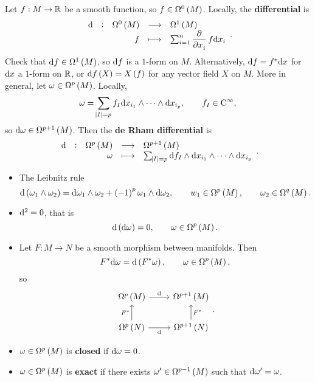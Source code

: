 Let $ f : M \to \mathbb{R} $ be a smooth function, so $ f \in \Omega^0\br{M} $. Locally, the \textbf{differential} is
$$ \function[\d]{\Omega^0\br{M}}{\Omega^1\br{M}}{f}{\sum_{i = 1}^n \dpd{}{x_i}f \d x_i}. $$
Check that $ \d f \in \Omega^1\br{M} $, so $ \mathrm{d} f $ is a $ 1 $-form on $ M $. Alternatively, $ \mathrm{d} f = f^*\mathrm{d} x $ for $ \mathrm{d} x $ a $ 1 $-form on $ \mathbb{R} $, or $ \d f\br{X} = X\br{f} $ for any vector field $ X $ on $ M $. More in general, let $ \omega \in \Omega^p\br{M} $. Locally,
$$ \omega = \sum_{\abs{I} = p} f_I \mathrm{d} x_{i_1} \wedge \dots \wedge \mathrm{d} x_{i_p}, \qquad f_I \in \mathrm{C}^\infty, $$
so $ \d\omega \in \Omega^{p + 1}\br{M} $. Then the \textbf{de Rham differential} is
$$ \function[\d]{\Omega^p\br{M}}{\Omega^{p + 1}\br{M}}{\omega}{\sum_{\abs{I} = p} \d f_I \wedge \d x_{i_1} \wedge \dots \wedge \d x_{i_p}}. $$

\pagebreak

\begin{proposition}
\label{prop:1.16}
\hfill
\begin{itemize}
\item The Leibnitz rule
$$ \d\br{\omega_1 \wedge \omega_2} = \d\omega_1 \wedge \omega_2 + \br{-1}^p\omega_1 \wedge \d\omega_2, \qquad w_1 \in \Omega^p\br{M}, \qquad \omega_2 \in \Omega^q\br{M}. $$
\item $ \mathrm{d}^2 = 0 $, that is
$$ \d\br{\d\omega} = 0, \qquad \omega \in \Omega^p\br{M}. $$
\item Let $ F : M \to N $ be a smooth morphism between manifolds. Then
$$ F^*\d\omega = \d\br{F^*\omega}, \qquad \omega \in \Omega^p\br{M}, $$
so
$$
\begin{tikzcd}
\Omega^p\br{M} \arrow{r}{\d} & \Omega^{p + 1}\br{M} \\
\Omega^p\br{N} \arrow{u}{F^*} \arrow[swap]{r}{\d} & \Omega^{p + 1}\br{N} \arrow[swap]{u}{F^*}
\end{tikzcd}.
$$
\end{itemize}
\end{proposition}


\begin{definition}
\hfill
\begin{itemize}
\item $ \omega \in \Omega^p\br{M} $ is \textbf{closed} if $ \mathrm{d}\omega = 0 $.
\item $ \omega \in \Omega^p\br{M} $ is \textbf{exact} if there exists $ \omega' \in \Omega^{p - 1}\br{M} $ such that $ \mathrm{d}\omega' = \omega $.
\end{itemize}
\end{definition}

